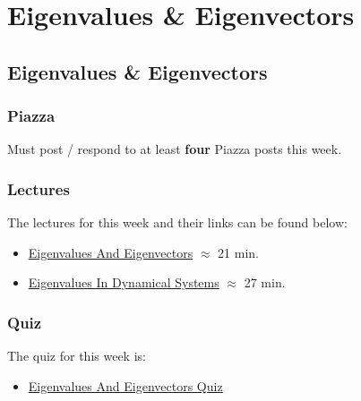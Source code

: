 \clearpage

\renewcommand{\ChapTitle}{Eigenvalues \& Eigenvectors}
\renewcommand{\SectionTitle}{Eigenvalues \& Eigenvectors}

\chapter{\ChapTitle}
\section{\SectionTitle}

\subsection{Piazza}

Must post / respond to at least \textbf{four} Piazza posts this week.

\subsection{Lectures}

The lectures for this week and their links can be found below:

\begin{itemize}
    \item \href{https://applied.cs.colorado.edu/mod/hvp/view.php?id=50826}{Eigenvalues And Eigenvectors} $\approx$ 21 min.
    \item \href{https://applied.cs.colorado.edu/mod/hvp/view.php?id=50827}{Eigenvalues In Dynamical Systems} $\approx$ 27 min.
\end{itemize}

\subsection{Quiz}

The quiz for this week is:

\begin{itemize}
    \item \href{https://applied.cs.colorado.edu/mod/quiz/view.php?id=52237}{Eigenvalues And Eigenvectors Quiz}
\end{itemize}